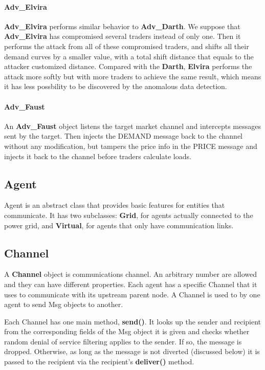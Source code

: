 \documentclass[12pt]{article}
\begin{document}
\paragraph{Adv\_Elvira} \mbox{}

\textbf{Adv\_Elvira} performs similar behavior to \textbf{Adv\_Darth}. We suppose that \textbf{Adv\_Elvira}
has compromised several traders instead of only one. Then it performs the attack from 
all of these compromised traders, and shifts all their demand curves by a smaller value, 
with a total shift distance that equals to the attacker customized distance. Compared 
with the \textbf{Darth}, \textbf{Elvira} performs the attack more softly but with more traders to achieve 
the same result, which means it has less possbility to be discovered by the anomalous data 
detection.

\paragraph{Adv\_Faust} \mbox{}

An \textbf{Adv\_Faust} object listens the target market channel and intercepts messages 
sent by the target. Then injects the DEMAND message back to the channel without any
modification, but tampers the price info in the PRICE message and injects it back 
to the channel before traders calculate loads. 

\subsection{Agent} \mbox{}

Agent is an abstract class that provides basic features for entities that 
communicate.  It has two subclasses: \textbf{Grid}, for agents actually connected
to the power grid, and \textbf{Virtual}, for agents that only have communication 
links.

\subsection{Channel} \mbox{}

A \textbf{Channel} object is communications channel.  An arbitrary number are 
allowed and they can have different properties.  Each agent has a specific 
Channel that it uses to communicate with its upstream parent node.  A Channel 
is used to by one agent to send Msg objects to another.

Each Channel has one main method, \textbf{send()}.  It looks up the sender and 
recipient from the corresponding fields of the Msg object it is given and checks 
whether random denial of service filtering applies to the sender.  If so, 
the message is dropped. Otherwise, as long as the message is not diverted (discussed
below) it is passed to the recipient via the recipient's \textbf{deliver()} method.
\end{document}
